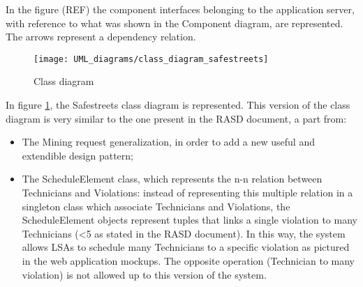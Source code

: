In the figure (REF) the component interfaces belonging to the application server, with reference to what was shown in the Component diagram, are represented. The arrows represent a dependency relation.	
\begin{figure}[H]
    \centering
    \texttt{[image: UML\_diagrams/class\_diagram\_safestreets]}
    \caption{Class diagram}
    \label{fig:class_diagram}
\end{figure}
In figure \ref{fig:class_diagram}, the Safestreets class diagram is represented. This version of the class diagram is very similar to the one present in the RASD document, a part from:
\begin{itemize}
    \item The Mining request generalization, in order to add a new useful and extendible design pattern;
    \item The ScheduleElement class, which represents the n-n relation between Technicians and Violations: instead of representing this multiple relation in a singleton class which associate Technicians and Violations, the ScheduleElement objects represent tuples that links a single violation to many Technicians (<5 as stated in the RASD document). In this way, the system allows LSAs to schedule many Technicians to a specific violation as pictured in the web application mockups. The opposite operation (Technician to many violation) is not allowed up to this version of the system.
\end{itemize}